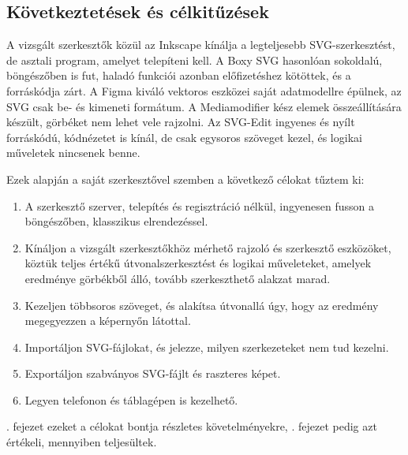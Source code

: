 \subsection{Következtetések és célkitűzések}
\label{sub:editor_conclusions}

A vizsgált szerkesztők közül az Inkscape kínálja a legteljesebb SVG-szerkesztést, de asztali program, amelyet telepíteni kell. A Boxy SVG hasonlóan sokoldalú, böngészőben is fut, haladó funkciói azonban előfizetéshez kötöttek, és a forráskódja zárt. A Figma kiváló vektoros eszközei saját adatmodellre épülnek, az SVG csak be- és kimeneti formátum. A Mediamodifier kész elemek összeállítására készült, görbéket nem lehet vele rajzolni. Az SVG-Edit ingyenes és nyílt forráskódú, kódnézetet is kínál, de csak egysoros szöveget kezel, és logikai műveletek nincsenek benne.


Ezek alapján a saját szerkesztővel szemben a következő célokat tűztem ki:

\begin{enumerate}
\item A szerkesztő szerver, telepítés és regisztráció nélkül, ingyenesen fusson a böngészőben, klasszikus elrendezéssel.
\item Kínáljon a vizsgált szerkesztőkhöz mérhető rajzoló és szerkesztő eszközöket, köztük teljes értékű útvonalszerkesztést és logikai műveleteket, amelyek eredménye görbékből álló, tovább szerkeszthető alakzat marad.
\item Kezeljen többsoros szöveget, és alakítsa útvonallá úgy, hogy az eredmény megegyezzen a képernyőn látottal.
\item Importáljon SVG-fájlokat, és jelezze, milyen szerkezeteket nem tud kezelni.
\item Exportáljon szabványos SVG-fájlt és raszteres képet.
\item Legyen telefonon és táblagépen is kezelhető.
\end{enumerate}

. fejezet ezeket a célokat bontja részletes követelményekre, . fejezet pedig azt értékeli, mennyiben teljesültek.
